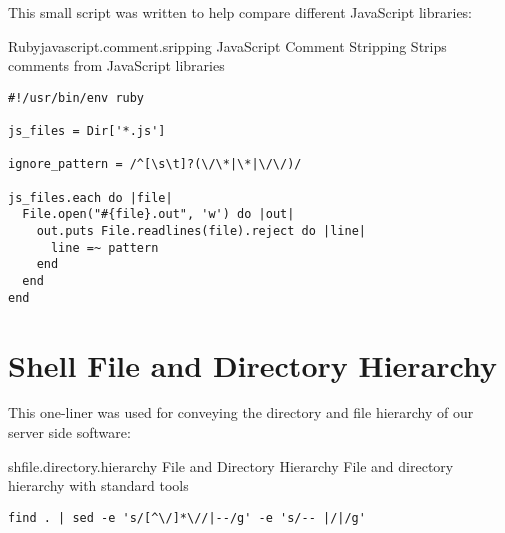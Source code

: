 This small script was written to help
compare different JavaScript libraries:


\begin{scode}{Ruby}{javascript.comment.sripping}{%
  JavaScript Comment Stripping}{%
  Strips comments from JavaScript libraries}
\begin{lstlisting}
#!/usr/bin/env ruby

js_files = Dir['*.js']

ignore_pattern = /^[\s\t]?(\/\*|\*|\/\/)/

js_files.each do |file|
  File.open("#{file}.out", 'w') do |out| 
    out.puts File.readlines(file).reject do |line|
      line =~ pattern
    end
  end
end
\end{lstlisting}
\end{scode}

\section{Shell File and Directory Hierarchy}
\label{section:source.code.hierarchy}

This one-liner was used for conveying the directory and file hierarchy of our
server side software:

\begin{scode}{sh}{file.directory.hierarchy}{%
   File and Directory Hierarchy}{%
  File and directory hierarchy with standard  tools}
\begin{lstlisting}
find . | sed -e 's/[^\/]*\//|--/g' -e 's/-- |/|/g'
\end{lstlisting}
\end{scode}


